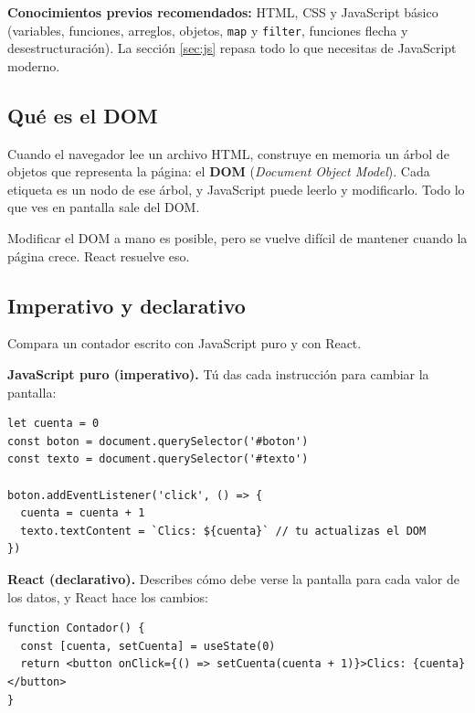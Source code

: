 \documentclass[11pt,a4paper]{article}
\newcommand{\cmd}[1]{\texttt{\color{reactdark}#1}}
\begin{document}
\textbf{Conocimientos previos recomendados:} HTML, CSS y JavaScript básico (variables, funciones, arreglos, objetos, \cmd{map} y \cmd{filter}, funciones flecha y desestructuración). La sección \ref{sec:js} repasa todo lo que necesitas de JavaScript moderno.

\subsection{Qué es el DOM}

Cuando el navegador lee un archivo HTML, construye en memoria un árbol de objetos que representa la página: el \textbf{DOM} (\emph{Document Object Model}). Cada etiqueta es un nodo de ese árbol, y JavaScript puede leerlo y modificarlo. Todo lo que ves en pantalla sale del DOM.

\begin{center}
\end{center}

Modificar el DOM a mano es posible, pero se vuelve difícil de mantener cuando la página crece. React resuelve eso.

\subsection{Imperativo y declarativo}

Compara un contador escrito con JavaScript puro y con React.

\textbf{JavaScript puro (imperativo).} Tú das cada instrucción para cambiar la pantalla:
\begin{lstlisting}[language=JSX]
let cuenta = 0
const boton = document.querySelector('#boton')
const texto = document.querySelector('#texto')

boton.addEventListener('click', () => {
  cuenta = cuenta + 1
  texto.textContent = `Clics: ${cuenta}` // tu actualizas el DOM
})
\end{lstlisting}

\textbf{React (declarativo).} Describes cómo debe verse la pantalla para cada valor de los datos, y React hace los cambios:
\begin{lstlisting}[language=JSX]
function Contador() {
  const [cuenta, setCuenta] = useState(0)
  return <button onClick={() => setCuenta(cuenta + 1)}>Clics: {cuenta}</button>
}
\end{lstlisting}
\end{document}
